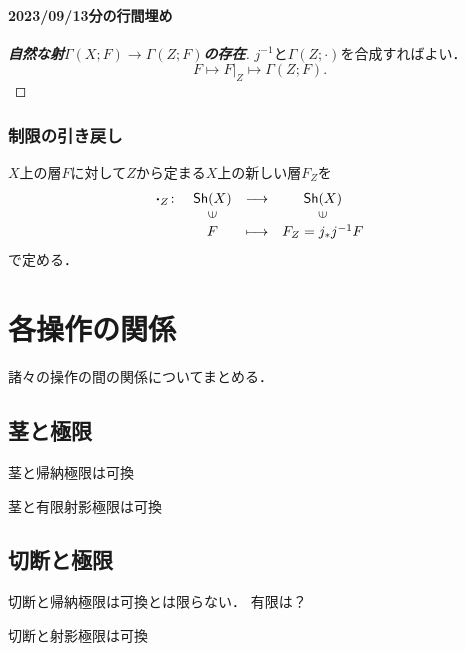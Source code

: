 \paragraph{2023/09/13分の行間埋め}

\begin{proof}[\textbf{自然な射\(\Gamma(X;F)\to\Gamma(Z;F)\)の存在}]
    \(j^{-1}\)と\(\Gamma(Z;\boldsymbol{\cdot})\)を合成すればよい．
    \[
        F\mapsto F|_Z\mapsto \Gamma(Z;F).
    \]
\end{proof}

\subsubsection{制限の引き戻し}

\(X\)上の層\(F\)に対して\(Z\)から定まる\(X\)上の新しい層\(F_Z\)を
\[
    \begin{array}{rccc}
        {\boldsymbol{\cdot}}_Z\colon&   \Sh(X)& \longrightarrow& \Sh(X)\\
        &   \rotatebox{90}{$\in$}&&\rotatebox{90}{$\in$}\\
        &   F&  \longmapsto&    F_Z=j_\ast j^{-1} F   
    \end{array}
\]
で定める．


















\section{各操作の関係}

諸々の操作の間の関係についてまとめる．

\subsection{茎と極限}
茎と帰納極限は可換

茎と有限射影極限は可換
\subsection{切断と極限}
切断と帰納極限は可換とは限らない．
有限は？

切断と射影極限は可換




























